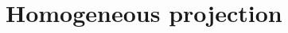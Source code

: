 \documentclass[final,3p,times]{elsarticle}
\begin{document}

\section{Homogeneous projection} 
\end{document}
